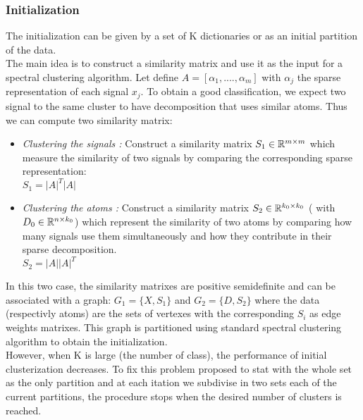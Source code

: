 \subsubsection{Initialization}
The initialization can be given by a set of K dictionaries or as an initial partition of the data.\\
The main idea is to construct a similarity matrix and use it as the input for a spectral clustering algorithm. Let define $A = [\alpha_1,....,  \alpha_m]$ with $\alpha_j$ the sparse representation of each signal $x_j$. To obtain a good classification, we expect two signal to the same cluster to have decomposition that uses similar atoms. Thus we can compute two similarity matrix:
\begin{itemize}
 \item \textit{Clustering the signals :} Construct a similarity matrix $S_1 \in \mathbb{R}^{m \times m}$ which measure the similarity of two signals by comparing the corresponding sparse representation:\\
 $S_1 = |A|^T |A|$
 \item \textit{Clustering the atoms :} Construct a similarity matrix $S_2 \in \mathbb{R}^{k_0 \times k_0}$ ( with $D_0 \in \mathbb{R}^{n \times k_0}$) which represent the similarity of two atoms by comparing how many signals use them simultaneously and how they contribute in their sparse decomposition.\\
 $S_2 = |A||A|^T$
\end{itemize}
In this two case, the similarity matrixes are positive semidefinite and can be associated with a graph: $G_1 = \{X,S_1\}$ and $G_2 = \{D,S_2\}$ where the data (respectivly atoms) are the sets of vertexes with the corresponding $S_i$ as edge weights matrixes. This graph is partitioned using standard spectral clustering algorithm to obtain the initialization.\\
However, when K is large (the number of class), the performance of initial clusterization decreases. To fix this problem \cite{5494985} proposed to stat with the whole set as the only partition and at each itation we subdivise in two sets each of the current partitions, the procedure stops when the desired number of clusters is reached.

